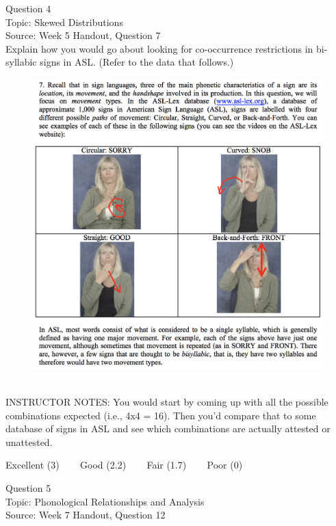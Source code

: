 \documentclass[12pt]{article}
\begin{document}
{\large Question 4}\\

Topic: Skewed Distributions\\
Source: Week 5 Handout, Question 7\\

Explain how you would go about looking for co-occurrence restrictions in bi-syllabic signs in ASL. (Refer to the data that follows.)\\

\begin{figure}[H]
\includegraphics{../images/ASL_movement.png}
\end{figure}

~\\
INSTRUCTOR NOTES: You would start by coming up with all the possible combinations expected (i.e., 4x4 = 16). Then you'd compare that to some database of signs in ASL and see which combinations are actually attested or unattested.


\vfill
Excellent (3) ~~~ Good (2.2) ~~~ Fair (1.7) ~~~ Poor (0)
\newpage

{\large Question 5}\\

Topic: Phonological Relationships and Analysis\\
Source: Week 7 Handout, Question 12\\
\end{document}
